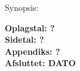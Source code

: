 \hfill
\begin{minipage}[t]{0.483\textwidth}
Synopsis: \\[5pt]
\fbox{\parbox{7cm}{\bigskip\bigskip}}

\vspace*{16.5cm}

\textbf{Oplagstal: ?} \\
\textbf{Sidetal: ?} \\
\textbf{Appendiks: ?} \\ 
\textbf{Afsluttet: DATO}

\end{minipage}

\vfill



